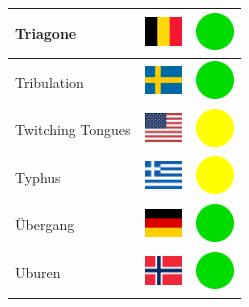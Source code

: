 \documentclass[12pt, a4paper, twoside]{report}
\begin{document}
\begin{center}
\begin{longtable}{|p{5cm}|p{2cm}|p{2cm}|}
Triagone & \includegraphics[width=1cm]{4x3/be} & \includegraphics[width=1cm]{likes/y} \\ \hline
Tribulation & \includegraphics[width=1cm]{4x3/se} & \includegraphics[width=1cm]{likes/y} \\ \hline
Twitching Tongues & \includegraphics[width=1cm]{4x3/us} & \includegraphics[width=1cm]{likes/m} \\ \hline
Typhus & \includegraphics[width=1cm]{4x3/gr} & \includegraphics[width=1cm]{likes/m} \\ \hline
Übergang & \includegraphics[width=1cm]{4x3/de} & \includegraphics[width=1cm]{likes/y} \\ \hline
Uburen & \includegraphics[width=1cm]{4x3/no} & \includegraphics[width=1cm]{likes/y} \\ \hline

\end{longtable}
\end{center}
\end{document}
